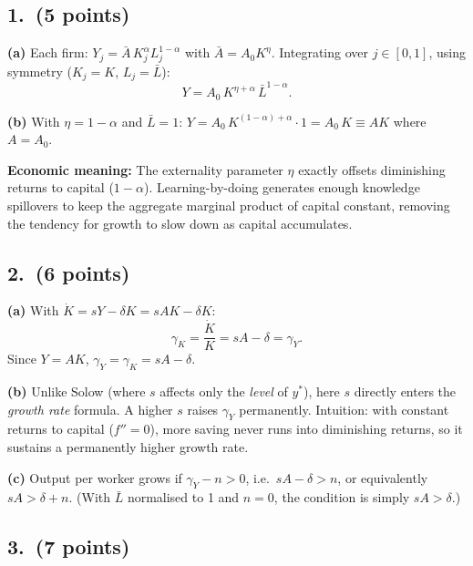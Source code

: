 \documentclass[a4paper,11pt]{article}
\begin{document}
\subsection*{1.\ (5 points)}

\begin{answerbox}
\textbf{(a)} Each firm: $Y_j = \bar{A}\,K_j^{\alpha}L_j^{1-\alpha}$ with
$\bar{A} = A_0 K^{\eta}$.  Integrating over $j\in[0,1]$, using symmetry
($K_j = K$, $L_j = \bar{L}$):
\[
    Y = A_0\,K^{\eta+\alpha}\,\bar{L}^{1-\alpha}.
\]

\textbf{(b)} With $\eta = 1-\alpha$ and $\bar{L}=1$:
$Y = A_0\,K^{(1-\alpha)+\alpha}\cdot 1 = A_0\,K \equiv AK$
where $A = A_0$.

\textbf{Economic meaning:} The externality parameter $\eta$ exactly offsets diminishing
returns to capital ($1-\alpha$).  Learning-by-doing generates enough knowledge spillovers
to keep the aggregate marginal product of capital constant, removing the tendency for
growth to slow down as capital accumulates.
\end{answerbox}

\subsection*{2.\ (6 points)}

\begin{answerbox}
\textbf{(a)} With $\dot{K} = sY - \delta K = sAK - \delta K$:
\[
    \boxed{\gamma_K = \frac{\dot{K}}{K} = sA - \delta = \gamma_Y.}
\]
Since $Y = AK$, $\gamma_Y = \gamma_K = sA - \delta$.

\textbf{(b)} Unlike Solow (where $s$ affects only the \emph{level} of $y^*$), here $s$
directly enters the \emph{growth rate} formula.  A higher $s$ raises $\gamma_Y$
permanently.  Intuition: with constant returns to capital ($f''=0$), more saving never
runs into diminishing returns, so it sustains a permanently higher growth rate.

\textbf{(c)} Output per worker grows if $\gamma_Y - n > 0$, i.e.\ $sA - \delta > n$,
or equivalently $sA > \delta + n$.  (With $\bar{L}$ normalised to 1 and $n=0$, the
condition is simply $sA > \delta$.)
\end{answerbox}

\subsection*{3.\ (7 points)}
\end{document}
